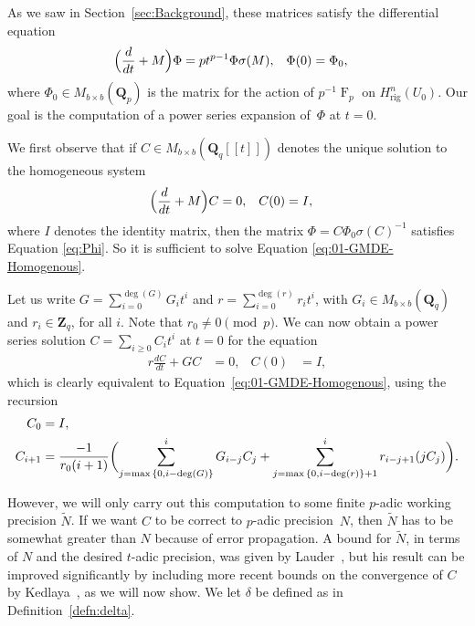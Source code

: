 \documentclass[a4paper,11pt]{article}
\numberwithin{equation}{section}
\newcommand{\ZZ}{\mathbf{Z}} %
\newcommand{\QQ}{\mathbf{Q}} %
\DeclareMathOperator{\Frob}{F}           %
\providecommand{\Hrig}{H_{\text{rig}}}  %
\theoremstyle{definition}
\begin{document}
As we saw in Section~\ref{sec:Background}, these matrices satisfy 
the differential equation
\begin{align} \label{eq:Phi}
\Bigl(\frac{d}{dt} + M\Bigr) \Phi &= p t^{p-1} \Phi \sigma(M), &\Phi(0)&=\Phi_0,
\end{align}
where $\Phi_0 \in M_{b \times b}(\QQ_p)$ is the matrix for the action 
of $p^{-1} \Frob_p$ on $\Hrig^n(U_0)$. Our goal is the computation of 
a power series expansion of~$\Phi$ at $t=0$.

We first observe that if $C \in M_{b \times b}(\QQ_q[[t]])$ denotes 
the unique solution to the homogeneous system
\begin{align} \label{eq:01-GMDE-Homogenous}
\Bigl(\frac{d}{dt} + M\Bigr) C &= 0,  &C(0)&=I,
\end{align}
where $I$ denotes the identity matrix, then the matrix
$\Phi = C \Phi_0 \sigma(C)^{-1}$
satisfies Equation \eqref{eq:Phi}. So it is sufficient to solve Equation 
\eqref{eq:01-GMDE-Homogenous}.

Let us write $G = \sum_{i=0}^{\deg(G)} G_i t^i$ and $r= \sum_{i=0}^{\deg(r)} r_i t^i$,
with $G_i \in M_{b \times b}(\QQ_q)$ and $r_i \in \ZZ_q$, for all $i$. Note that
$r_0 \neq 0 \pmod{p}$.
We can now obtain a power series solution $C = \sum_{i \geq 0} C_i t^i$ at $t=0$ for 
the equation
\begin{align*}
r \frac{dC}{dt} + G C &= 0, &C(0)&=I,
\end{align*}
which is clearly equivalent to Equation~\eqref{eq:01-GMDE-Homogenous}, 
using the recursion 
\begin{align}
C_0 &= I, \notag \\ 
C_{i+1} &= \frac{-1}{r_0 (i+1)} \biggl(
    \sum_{j=\max{\{0,i-\deg(G)\}}}^i G_{i-j} C_j + 
    \sum_{j=\max{\{0,i-\deg(r)\}}+1}^i r_{i-j+1} (j C_j) \biggr). \label{eq:recursiondifeq}
\end{align}

However, we will only carry out this computation to some finite $p$-adic 
working precision $\tilde{N}$. If we want $C$ to be correct to $p$-adic 
precision~$N$, then $\tilde{N}$ has to be somewhat greater than $N$ because 
of error propagation. A bound for $\tilde{N}$, in terms of $N$ and the 
desired $t$-adic precision, was given by Lauder~\citep[Theorem~5.1]{Lauder2006}, 
but his result can be improved significantly by including more recent bounds 
on the convergence of $C$ by Kedlaya~\citep{Kedlaya2010}, as we will now show. 
We let $\delta$ be defined as in Definition~\ref{defn:delta}. 
\end{document}
